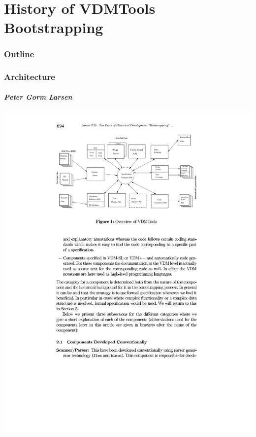 \documentclass[slidestop,uncompress,mathserif]{beamer}
\newcommand{\from}[1]{%
\noindent%
\begin{flushright}%
    \emph{\small #1}%
\end{flushright}%
}
\begin{document}
\section[VDMTools]{History of VDMTools Bootstrapping} 
\label{sec:vdmtools}

\begin{frame}
  \frametitle{Outline}
  \tableofcontents[current]
\end{frame}



\begin{frame}[c]
  \frametitle{Architecture}
  \framesubtitle{\emph{Peter Gorm Larsen \cite{Larsen01}}}

  \begin{center}
    \includegraphics[width=\textwidth]{images/vdmtools_arch.pdf}
  \end{center}
\end{frame}
\end{document}
